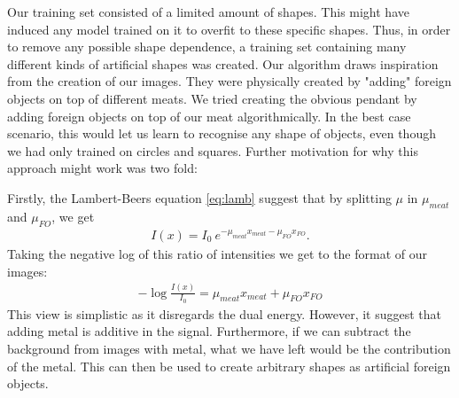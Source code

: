 Our training set consisted of a limited amount of shapes. This might have induced any model trained on it to overfit to these specific shapes.
Thus, in order to remove any possible shape dependence, a training set containing many different kinds of artificial shapes was created.
Our algorithm draws inspiration from the creation of our images. They were physically created by "adding" foreign objects on top of different meats. 
We tried creating the obvious pendant by adding foreign objects on top of our meat algorithmically.
In the best case scenario, this would let us learn to recognise any shape of objects, even though we had only trained on circles and squares.
Further motivation for why this approach might work was two fold:

Firstly, the Lambert-Beers equation \eqref{eq:lamb} suggest that by splitting $\mu$ in $\mu_{meat}$ and $\mu_{FO}$, we get
\begin{align}
	\label{eq:lamb_extended}
	I(x) = I_0 \:e^{-\mu_{meat} x_{meat} - \mu_{FO} x_{FO} }.
\end{align}
Taking the negative log of this ratio of intensities we get to the format of our images:
\begin{align}
	\label{eq:meat_metal_sum}
	 - \log\frac{I(x)}{I_0}  = \mu_{meat} x_{meat} + \mu_{FO} x_{FO} 
\end{align}
This view is simplistic as it disregards the dual energy.
However, it suggest that adding metal is additive in the signal.
Furthermore, if we can subtract the background from images with metal, what we have left would be the contribution of the metal. 
This can then be used to create arbitrary shapes as artificial foreign objects.

